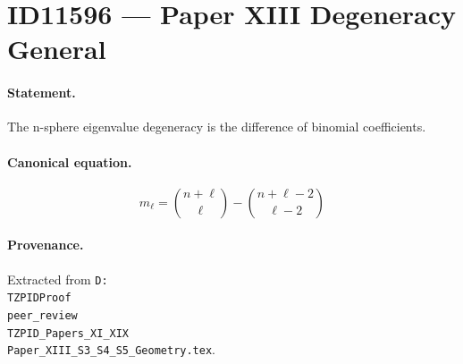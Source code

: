 \section*{ID11596 --- Paper XIII Degeneracy General}

\paragraph{Statement.}
The n-sphere eigenvalue degeneracy is the difference of binomial coefficients.

\paragraph{Canonical equation.}
\[
m_\ell=\binom{n+\ell}{\ell}-\binom{n+\ell-2}{\ell-2}
\]

\paragraph{Provenance.}
Extracted from \texttt{D:\\TZPIDProof\\peer\_review\\TZPID\_Papers\_XI\_XIX\\Paper\_XIII\_S3\_S4\_S5\_Geometry.tex}.
